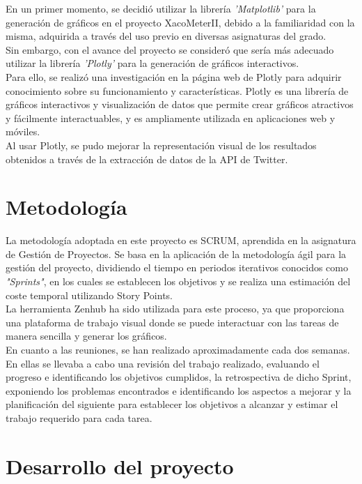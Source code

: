 \begin{itemize}
    En un primer momento, se decidió utilizar la librería \textit{'Matplotlib'} para la generación de gráficos en el proyecto XacoMeterII, debido a la familiaridad con la misma, adquirida a través del uso previo en diversas asignaturas del grado.\\ 
    Sin embargo, con el avance del proyecto se consideró que sería más adecuado utilizar la librería \textit{'Plotly'} para la generación de gráficos interactivos.\\
    Para ello, se realizó una investigación en la página web de Plotly para adquirir conocimiento sobre su funcionamiento y características. Plotly es una librería de gráficos interactivos y visualización de datos que permite crear gráficos atractivos y fácilmente interactuables, y es ampliamente utilizada en aplicaciones web y móviles.\\
    Al usar Plotly, se pudo mejorar la representación visual de los resultados obtenidos a través de la extracción de datos de la API de Twitter.

\end{itemize}
\section{Metodología}
La metodología adoptada en este proyecto es SCRUM, aprendida en la asignatura de Gestión de Proyectos. Se basa en la aplicación de la metodología ágil para la gestión del proyecto, dividiendo el tiempo en periodos iterativos conocidos como \textit{"Sprints"}, en los cuales se establecen los objetivos y se realiza una estimación del coste temporal utilizando Story Points. 
\\La herramienta Zenhub ha sido utilizada para este proceso, ya que proporciona una plataforma de trabajo visual donde se puede interactuar con las tareas de manera sencilla y generar los gráficos.\\

En cuanto a las reuniones, se han realizado aproximadamente cada dos semanas. En ellas se llevaba a cabo una revisión del trabajo realizado, evaluando el progreso e identificando los objetivos cumplidos, la retrospectiva de dicho Sprint, exponiendo los problemas encontrados e identificando los aspectos a mejorar y la planificación del siguiente para establecer los objetivos a alcanzar y estimar el trabajo requerido para cada tarea.


\section{Desarrollo del proyecto}
